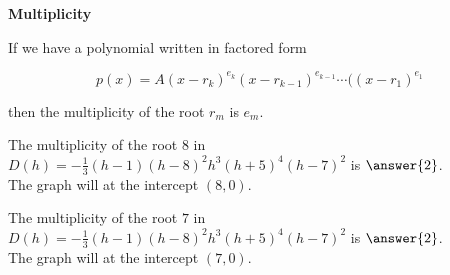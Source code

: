 \documentclass{ximera}
\author{Lee Wayand}
\begin{document}
\begin{exercise}






\begin{idea} \textbf{\textcolor{blue!55!black}{Multiplicity}}


If we have a polynomial written in factored form

\[
p(x) = A (x-r_k)^{e_k} (x-r_{k-1})^{e_{k-1}}  \cdots ((x-r_1)^{e_1}
\]

then the multiplicity of the root $r_m$ is $e_m$. \\





\end{idea}






\begin{question}



The multiplicity of the root $8$ in $D(h) = -\frac{1}{3} (h - 1) (h - 8)^2 h^3 (h + 5)^4 (h - 7)^2$ is $\answer{2}$. \\



The graph will  at the intercept $(8, 0)$.




\end{question}











\begin{question}



The multiplicity of the root $7$ in $D(h) = -\frac{1}{3} (h - 1) (h - 8)^2 h^3 (h + 5)^4 (h - 7)^2$ is $\answer{2}$. \\



The graph will  at the intercept $(7, 0)$.




\end{question}













\end{exercise}
\end{document}
